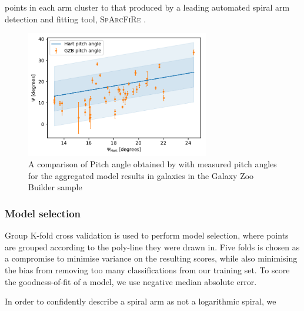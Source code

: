 \documentclass[../main.tex]{subfiles}
\begin{document}
points in each arm cluster to that produced by a leading automated spiral arm detection and fitting tool, \textsc{SpArcFiRe} \citep{Davis2014:1402.1910v1}.

\begin{figure}
  \includegraphics[width=8cm]{images__results/pitch-angle-comparison.pdf}
  \caption{A comparison of Pitch angle obtained by \citet{Hart2016:1607.01019v1} with measured pitch angles for the aggregated model results in galaxies in the Galaxy Zoo Builder sample}
  \label{fig:hart_pitch_angle}
\end{figure}



\subsubsection{Model selection}


Group K-fold cross validation is used to perform model selection, where points are grouped according to the poly-line they were drawn in. Five folds is chosen as a compromise to minimise variance on the resulting scores, while also minimising the bias from removing too many classifications from our training set. To score the goodness-of-fit of a model, we use negative median absolute error.


In order to confidently describe a spiral arm as not a logarithmic spiral, we 
\end{document}
